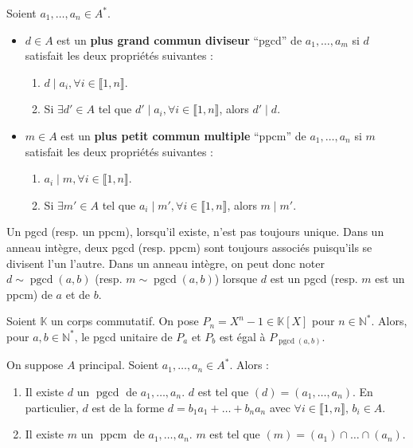 	\begin{definition}
		Soient $a_1, \dots, a_n \in A^*$.
		\begin{itemize}
			\item $d \in A$ est un \textbf{plus grand commun diviseur} ``pgcd'' de $a_1, \dots, a_m$ si $d$ satisfait les deux propriétés suivantes :
			\begin{enumerate}[label=(\roman*)]
				\item $d \mid a_i, \forall i \in \llbracket 1, n \rrbracket$.
				\item Si $\exists d' \in A$ tel que $d' \mid a_i, \forall i \in \llbracket 1, n \rrbracket$, alors $d' \mid d$.
			\end{enumerate}
			\item $m \in A$ est un \textbf{plus petit commun multiple} ``ppcm'' de $a_1, \dots, a_n$ si $m$ satisfait les deux propriétés suivantes :
			\begin{enumerate}[label=(\roman*)]
				\item $a_i \mid m, \forall i \in \llbracket 1, n \rrbracket$.
				\item Si $\exists m' \in A$ tel que $a_i \mid m', \forall i \in \llbracket 1, n \rrbracket$, alors $m \mid m'$.
			\end{enumerate}
		\end{itemize}
	\end{definition}

	\begin{remark}
		Un pgcd (resp. un ppcm), lorsqu'il existe, n'est pas toujours unique. Dans un anneau intègre, deux pgcd (resp. ppcm) sont toujours associés puisqu'ils se divisent l'un l'autre. Dans un anneau intègre, on peut donc noter $d \sim \operatorname{pgcd}(a, b)$ (resp. $m \sim \operatorname{pgcd}(a, b)$) lorsque $d$ est un pgcd (resp. $m$ est un ppcm) de $a$ et de $b$.
	\end{remark}


	\begin{example}
		Soient $\mathbb{K}$ un corps commutatif. On pose $P_n = X^n - 1 \in \mathbb{K}[X]$ pour $n \in \mathbb{N}^*$. Alors, pour $a, b \in \mathbb{N}^*$, le pgcd unitaire de $P_a$ et $P_b$ est égal à $P_{\operatorname{pgcd}(a,b)}$.
	\end{example}


	\begin{theorem}
		On suppose $A$ principal. Soient $a_1, \dots, a_n \in A^*$. Alors :
		\begin{enumerate}[label=(\roman*)]
			\item Il existe $d$ un $\operatorname{pgcd}$ de $a_1, \dots, a_n$. $d$ est tel que $(d) = (a_1, \dots, a_n)$. En particulier, $d$ est de la forme $d = b_1 a_1 + \dots + b_n a_n$ avec $\forall i \in \llbracket 1, n \rrbracket, \, b_i \in A$.
			\item Il existe $m$ un $\operatorname{ppcm}$ de $a_1, \dots, a_n$. $m$ est tel que $(m) = (a_1) \cap \dots \cap (a_n)$.
		\end{enumerate}
	\end{theorem}

